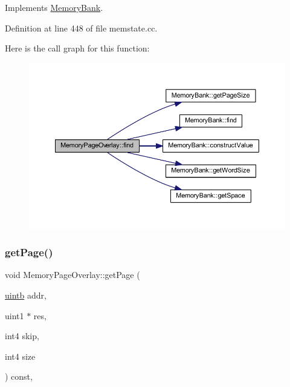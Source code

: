 Implements \mbox{\hyperlink{class_memory_bank_a421a5b8dd872d0c3e462d9055fa4266d}{Memory\+Bank}}.



Definition at line 448 of file memstate.\+cc.

Here is the call graph for this function\+:
\nopagebreak
\begin{figure}[H]
\begin{center}
\leavevmode
\includegraphics[width=350pt]{class_memory_page_overlay_a7ba248277eadf04ca7895dea1e614148_cgraph}
\end{center}
\end{figure}
\mbox{\label{class_memory_page_overlay_a0b502920d00bee935fdd15a2e2d823f2}} 
\subsubsection{\texorpdfstring{getPage()}{getPage()}}
{\footnotesize\ttfamily void Memory\+Page\+Overlay\+::get\+Page (\begin{DoxyParamCaption}\item[{\mbox{\hyperlink{types_8h_a2db313c5d32a12b01d26ac9b3bca178f}{uintb}}}]{addr,  }\item[{uint1 $\ast$}]{res,  }\item[{int4}]{skip,  }\item[{int4}]{size }\end{DoxyParamCaption}) const\hspace{0.3cm}{\ttfamily [protected]}, {\ttfamily [virtual]}}



